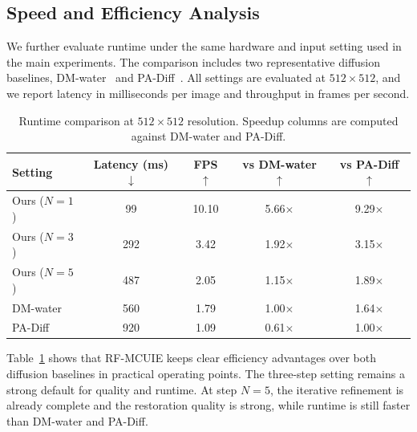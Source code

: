 \subsection{Speed and Efficiency Analysis}
\label{sec:speed}

We further evaluate runtime under the same hardware and input setting used in the main experiments. The comparison includes two representative diffusion baselines, DM-water~\cite{r24} and PA-Diff~\cite{r8}. All settings are evaluated at $512\times512$, and we report latency in milliseconds per image and throughput in frames per second.

\begin{table}[H]
    \centering
    \small
    \caption{Runtime comparison at $512\times512$ resolution. Speedup columns are computed against DM-water and PA-Diff.}
    \label{tab:speed_runtime}
    \setlength{\tabcolsep}{3.5pt}
    \begin{tabular*}{\linewidth}{@{\extracolsep{\fill}}lcccc}
        \toprule
        Setting & Latency (ms) $\downarrow$ & FPS $\uparrow$ & vs DM-water $\uparrow$ & vs PA-Diff $\uparrow$ \\
        \midrule
        Ours ($N=1$) & 99 & 10.10 & 5.66$\times$ & 9.29$\times$ \\
        Ours ($N=3$) & 292 & 3.42 & 1.92$\times$ & 3.15$\times$ \\
        Ours ($N=5$) & 487 & 2.05 & 1.15$\times$ & 1.89$\times$ \\
        DM-water~\cite{r24} & 560 & 1.79 & 1.00$\times$ & 1.64$\times$ \\
        PA-Diff~\cite{r8} & 920 & 1.09 & 0.61$\times$ & 1.00$\times$ \\
        \bottomrule
    \end{tabular*}
\end{table}

Table~\ref{tab:speed_runtime} shows that RF-MCUIE keeps clear efficiency advantages over both diffusion baselines in practical operating points. The three-step setting remains a strong default for quality and runtime. At step $N=5$, the iterative refinement is already complete and the restoration quality is strong, while runtime is still faster than DM-water and PA-Diff.

